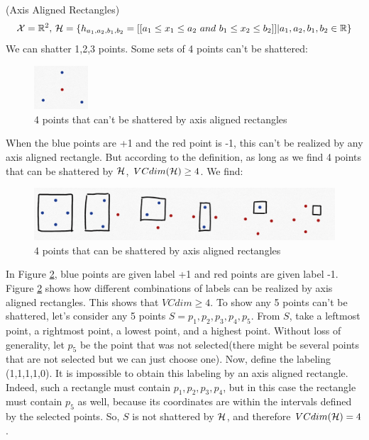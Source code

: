 \documentclass{article}
\begin{document}
\begin{example}(Axis Aligned Rectangles)
  \begin{displaymath}
	\mathcal{X}=\mathbb{R}^2,\,\mathcal{H}=\{h_{a_1, a_2, b_1,b_2}=[[a_1\leq x_1 \leq a_2\ and\ b_1\leq x_2 \leq b_2]]|a_1, a_2, b_1,b_2\in \mathbb{R}\}
  \end{displaymath}
  We can shatter 1,2,3 points. Some sets of 4 points can’t be shattered:
  \begin{figure}[H]
  \centering
  \includegraphics[width=20mm]{f1}
  \caption{4 points that can't be shattered by axis aligned rectangles}\label{f1}
  \end{figure}
  When the blue points are +1 and the red point is -1, this can't be realized by any axis aligned rectangle. But according to the definition, as long as we find 4 points that can be shattered by $\mathcal{H}$, $VCdim(\mathcal{H})\geq 4$. We find:
  
  \begin{figure}[H]
  \centering
  \includegraphics[width=120mm]{f2}
  \caption{4 points that can be shattered by axis aligned rectangles}\label{f2}
  \end{figure}
  In Figure \ref{f2}, blue points are given label +1 and red points are given label -1. Figure \ref{f2} shows how different combinations of labels can be realized by axis aligned rectangles. This shows that $VCdim \geq 4$. To show any 5 points can't be shattered, let's consider any 5 points $S={p_1, p_2, p_3, p_4, p_5}$. From $S$, take a leftmost point, a rightmost point, a lowest point, and a highest point. Without loss of generality, let $p_5$ be the point that was not selected(there might be several points that are not selected but we can just choose one). Now, define the labeling (1,1,1,1,0). It is impossible to obtain this labeling by an axis aligned rectangle. Indeed, such a rectangle must contain $p_1, p_2, p_3, p_4$, but in this case the rectangle must contain $p_5$ as well, because its coordinates are within the intervals defined by the selected points. So, $S$ is not shattered by $\mathcal{H}$, and therefore $VCdim(\mathcal{H}) = 4$.
\end{example}
\end{document}

